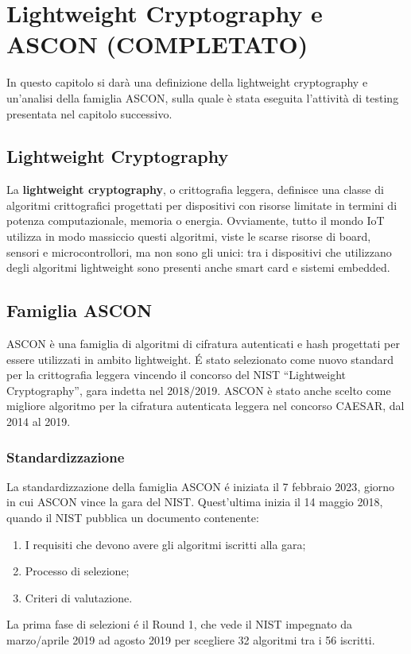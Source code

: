 \chapter{Lightweight Cryptography e ASCON (COMPLETATO)}

In questo capitolo si darà una definizione della lightweight cryptography e un'analisi della famiglia ASCON, sulla quale è stata eseguita l'attività di testing presentata nel capitolo successivo.

\section{Lightweight Cryptography}

La \textbf{lightweight cryptography}, o crittografia leggera, definisce una classe di algoritmi crittografici progettati per dispositivi con risorse limitate in termini di potenza computazionale, memoria o energia. Ovviamente, tutto il mondo IoT utilizza in modo massiccio questi algoritmi, viste le scarse risorse di board, sensori e microcontrollori, ma non sono gli unici: tra i dispositivi che utilizzano degli algoritmi lightweight sono presenti anche smart card e sistemi embedded.

\section{Famiglia ASCON}

ASCON è una famiglia di algoritmi di cifratura autenticati e hash progettati per essere utilizzati in ambito lightweight. É stato selezionato come nuovo standard per la crittografia leggera vincendo il concorso del NIST ``Lightweight Cryptography'', gara indetta nel 2018/2019. ASCON è stato anche scelto come migliore algoritmo per la cifratura autenticata leggera nel concorso CAESAR, dal 2014 al 2019\cite{ascon-overview}. \\

\subsection{Standardizzazione}

La standardizzazione della famiglia ASCON é iniziata il 7 febbraio 2023\cite{nist-timeline}, giorno in cui ASCON vince la gara del NIST. Quest'ultima inizia il 14 maggio 2018\cite{nist-timeline}, quando il NIST pubblica un documento contenente\cite{nist-competition}: \begin{enumerate}
    \item I requisiti che devono avere gli algoritmi iscritti alla gara;
    \item Processo di selezione;
    \item Criteri di valutazione.
\end{enumerate}
La prima fase di selezioni é il Round 1, che vede il NIST impegnato da marzo/aprile 2019 ad agosto 2019 per scegliere 32 algoritmi tra i 56 iscritti\cite{nist-timeline}\cite{nist-competition}\cite{nist-round-1}. \\

